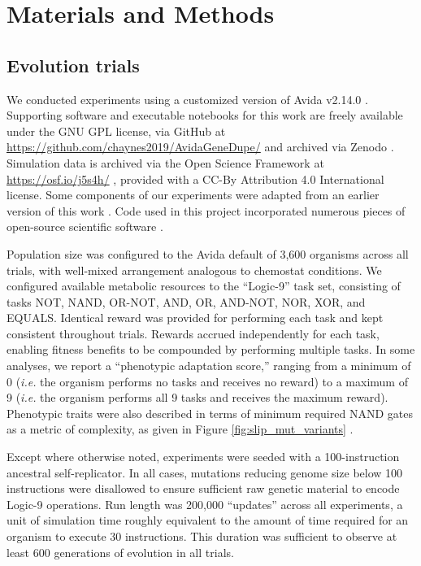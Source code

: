 \section{Materials and Methods} \label{sec:methods}

\subsection{Evolution trials}

We conducted experiments using a customized version of Avida v2.14.0 \citep{Ofria:2009avida}.
Supporting software and executable notebooks for this work are freely available under the GNU GPL license, via GitHub at \url{https://github.com/chaynes2019/AvidaGeneDupe/} and archived via Zenodo \citep{haynes_2025,https://doi.org/10.25495/7gxk-rd71}.
Simulation data is archived via the Open Science Framework at \url{https://osf.io/j5s4h/} \citep{Moreno_Haynes_2025,foster2017open}, provided with a CC-By Attribution 4.0 International license.
Some components of our experiments were adapted from an earlier version of this work \citep{lalejini2017gene}.
Code used in this project incorporated numerous pieces of open-source scientific software \citep{2020SciPy-NMeth,harris2020array,reback2020pandas,mckinney-proc-scipy-2010,waskom2021seaborn,hunter2007matplotlib,moreno2023teeplot,r_core_team_r:_2015}.

Population size was configured to the Avida default of 3,600 organisms across all trials, with well-mixed arrangement analogous to chemostat conditions.
We configured available metabolic resources to the ``Logic-9'' task set, consisting of tasks NOT, NAND, OR-NOT, AND, OR, AND-NOT, NOR, XOR, and EQUALS.
Identical reward was provided for performing each task and kept consistent throughout trials.
Rewards accrued independently for each task, enabling fitness benefits to be compounded by performing multiple tasks.
In some analyses, we report a ``phenotypic adaptation score,'' ranging from a minimum of 0 (\textit{i.e.} the organism performs no tasks and receives no reward) to a maximum of 9 (\textit{i.e.} the organism performs all 9 tasks and receives the maximum reward).
Phenotypic traits were also described in terms of minimum required NAND gates as a metric of complexity, as given in Figure \ref{fig:slip_mut_variants} \citep{lenski2003evolutionary}.

Except where otherwise noted, experiments were seeded with a 100-instruction ancestral self-replicator.
In all cases, mutations reducing genome size below 100 instructions were disallowed to ensure sufficient raw genetic material to encode Logic-9 operations.
Run length was 200,000 ``updates'' across all experiments, a unit of simulation time roughly equivalent to the amount of time required for an organism to execute 30 instructions.
This duration was sufficient to observe at least 600 generations of evolution in all trials.


